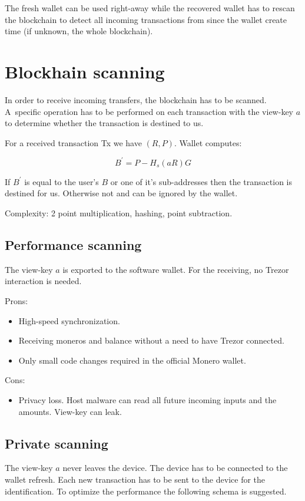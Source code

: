 \documentclass[]{article}
\begin{document}
The fresh wallet can be used right-away while the recovered wallet has to rescan the blockchain to detect all incoming transactions from since the wallet create time (if unknown, the whole blockchain).

\section{Blockhain scanning}

In order to receive incoming transfers, the blockchain has to be scanned. A~specific operation has to be performed on each transaction with the view-key $a$ to determine whether the transaction is destined to us.

For a received transaction Tx we have $\left(R, P\right)$.
Wallet computes: 

\begin{equation}
B^\prime = P - H_s(aR)G
\end{equation}

If $B^\prime$ is equal to the user's $B$ or one of it's sub-addresses then the transaction is destined for us. Otherwise not and can be ignored by the wallet.

Complexity: 2 point multiplication, hashing, point subtraction.

\subsection{Performance scanning} 
The view-key $a$ is exported to the software wallet. For the receiving, no Trezor interaction is needed. 

\noindent Prons:
\begin{itemize}
	\item High-speed synchronization.
	\item Receiving moneros and balance without a need to have Trezor connected.
	\item Only small code changes required in the official Monero wallet.
\end{itemize}

\noindent Cons:
\begin{itemize}
	\item Privacy loss. Host malware can read all future incoming inputs and the amounts. View-key can leak.
\end{itemize}

\subsection{Private scanning}
The view-key $a$ never leaves the device. The device has to be connected
to the wallet refresh. 
Each new transaction has to be sent to the device for the identification.
To optimize the performance the following schema is suggested.
\end{document}
